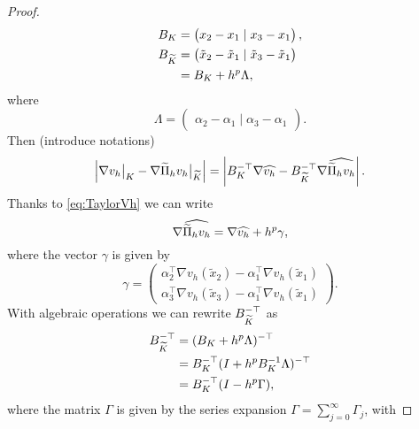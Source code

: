 \documentclass[10pt]{article}
\begin{document}
\begin{proof}
	\begin{equation}
	\begin{aligned}
		B_K &= \begin{pmatrix} x_2 - x_1 \mid x_3 - x_1 \end{pmatrix},\\
		B_{\widetilde K} &= \begin{pmatrix} \tilde x_2 - \tilde x_1 \mid \tilde x_3 - \tilde x_1\end{pmatrix}\\
		&= B_K + h^p \Lambda,
	\end{aligned}
	\end{equation}
	where
	\begin{equation}
		\Lambda = \begin{pmatrix} \alpha_2 - \alpha_1 \mid \alpha_3 - \alpha_1 \end{pmatrix}.
	\end{equation}
	Then (introduce notations)
	\begin{equation}
		\left\lvert\nabla v_h\bigr\rvert_{K} - \nabla \widetilde \Pi_h v_h \bigr\rvert_{\widetilde K}\right\rvert = \left\lvert B_K^{-\top}\nabla \widehat{v_h} - B_{\widetilde K}^{-\top}\nabla \widehat{\widetilde \Pi_h v_h}\right\rvert.
	\end{equation}
	Thanks to \eqref{eq:TaylorVh} we can write
	\begin{equation}
		\nabla \widehat{\widetilde \Pi_h v_h} = \nabla \widehat{v_h} + h^p \gamma, 
	\end{equation}
	where the vector $\gamma$ is given by
	\begin{equation}
		\gamma = \begin{pmatrix} \alpha_2^\top \nabla v_h(\tilde x_2) - \alpha_1^\top \nabla v_h(\tilde x_1) \\
		                         \alpha_3^\top \nabla v_h(\tilde x_3) - \alpha_1^\top \nabla v_h(\tilde x_1) \end{pmatrix}.
	\end{equation}
	With algebraic operations we can rewrite $B_{\widetilde K}^{-\top}$ as 
	\begin{equation}
	\begin{aligned}
		B_{\widetilde K}^{-\top} &= (B_K + h^p \Lambda)^{-\top} \\ 
		&= B_K^{-\top}(I + h^p B_K^{-1}\Lambda)^{-\top} \\
		&= B_K^{-\top}(I - h^p \Gamma),
	\end{aligned}
	\end{equation}
	where the matrix $\Gamma$ is given by the series expansion $\Gamma = \sum_{j=0}^\infty \Gamma_j$, with

\end{proof}
\end{document}
